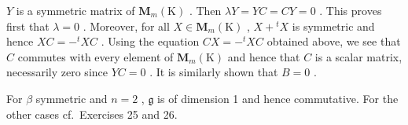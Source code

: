 \(Y\) is a symmetric matrix of \(\mathbf{M}_m(\mathrm{K})\) . Then \(\lambda Y = YC = CY = 0\) . This proves first that \(\lambda = 0\) . Moreover, for all \(X \in \mathbf{M}_m(\mathrm{K})\) , \(X + {}^t X\) is symmetric and hence \(XC = -{}^t XC\) . Using the equation \(CX = -{}^t XC\) obtained above, we see that \(C\) commutes with every element of \(\mathbf{M}_m(\mathrm{K})\) and hence that \(C\) is a scalar matrix, necessarily zero since \(YC = 0\) . It is similarly shown that \(B = 0\) .

For \(\beta\) symmetric and \(n = 2\) , \(\mathfrak{g}\) is of dimension 1 and hence commutative. For the other cases cf.~Exercises 25 and 26.


